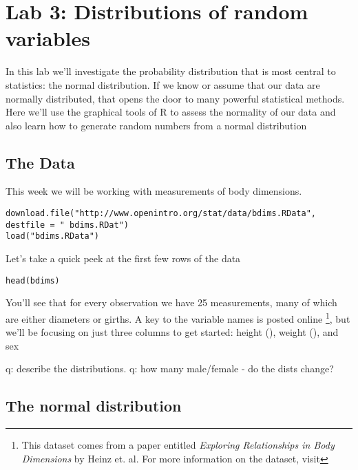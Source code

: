 \documentclass[11pt]{article}
\begin{document}
\section*{Lab 3: Distributions of random variables}

In this lab we'll investigate the probability distribution that is most central to statistics: the normal distribution.  If we know or assume that our data are normally distributed, that opens the door to many powerful statistical methods.  Here we'll use the graphical tools of R to assess the normality of our data and also learn how to generate random numbers from a normal distribution

%

\subsection*{The Data}

This week we will be working with measurements of body dimensions.

\begin{lstlisting}
download.file("http://www.openintro.org/stat/data/bdims.RData",
destfile = " bdims.RDat")
load("bdims.RData")
\end{lstlisting}

Let's take a quick peek at the first few rows of the data

\begin{lstlisting}
head(bdims)
\end{lstlisting}

You'll see that for every observation we have 25 measurements, many of which are either diameters or girths.  A key to the variable names is posted online
\footnote{This dataset comes from a paper entitled \emph{Exploring Relationships in Body Dimensions} by Heinz et. al.  For more information on the dataset, visit }, but we'll be focusing on just three columns to get started: height (), weight (), and sex

\begin{exercise}
q: describe the distributions.
q: how many male/female - do the dists change?
\end{exercise}


%

\subsection*{The normal distribution}
\end{document}
